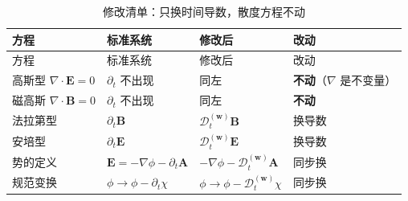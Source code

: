 \documentclass[
  chinese,
  a4paper,
  UTF8,
  12pt,
  oneside,
  openany]{ctexbook}
\theoremstyle{plain}
\theoremstyle{plain}
\theoremstyle{plain}
\theoremstyle{definition}
\theoremstyle{plain}
\theoremstyle{plain}
\theoremstyle{remark}
\begin{document}
\begin{longtable}[]{@{}
  >{\raggedright\arraybackslash}p{}
  >{\raggedright\arraybackslash}p{}
  >{\raggedright\arraybackslash}p{}
  >{\raggedright\arraybackslash}p{}@{}}
\caption{修改清单：只换时间导数，散度方程不动}\label{tbl-modification}\tabularnewline
\toprule\noalign{}
\begin{minipage}[b]{\linewidth}\raggedright
方程
\end{minipage} & \begin{minipage}[b]{\linewidth}\raggedright
标准系统
\end{minipage} & \begin{minipage}[b]{\linewidth}\raggedright
修改后
\end{minipage} & \begin{minipage}[b]{\linewidth}\raggedright
改动
\end{minipage} \\
\midrule\noalign{}
\endfirsthead
\toprule\noalign{}
\begin{minipage}[b]{\linewidth}\raggedright
方程
\end{minipage} & \begin{minipage}[b]{\linewidth}\raggedright
标准系统
\end{minipage} & \begin{minipage}[b]{\linewidth}\raggedright
修改后
\end{minipage} & \begin{minipage}[b]{\linewidth}\raggedright
改动
\end{minipage} \\
\midrule\noalign{}
\endhead
\bottomrule\noalign{}
\endlastfoot
高斯型 \(\nabla\cdot\mathbf{E}=0\) & \(\partial_t\) 不出现 & 同左 &
\textbf{不动}（\(\nabla\) 是不变量） \\
磁高斯 \(\nabla\cdot\mathbf{B}=0\) & \(\partial_t\) 不出现 & 同左 &
\textbf{不动} \\
法拉第型 & \(\partial_t\mathbf{B}\) &
\(\mathcal{D}_t^{(\mathbf{w})}\mathbf{B}\) & 换导数 \\
安培型 & \(\partial_t\mathbf{E}\) &
\(\mathcal{D}_t^{(\mathbf{w})}\mathbf{E}\) & 换导数 \\
势的定义 & \(\mathbf{E}=-\nabla\phi-\partial_t\mathbf{A}\) &
\(-\nabla\phi-\mathcal{D}_t^{(\mathbf{w})}\mathbf{A}\) & 同步换 \\
规范变换 & \(\phi\to\phi-\partial_t\chi\) &
\(\phi\to\phi-\mathcal{D}_t^{(\mathbf{w})}\chi\) & 同步换 \\
\end{longtable}
\end{document}
